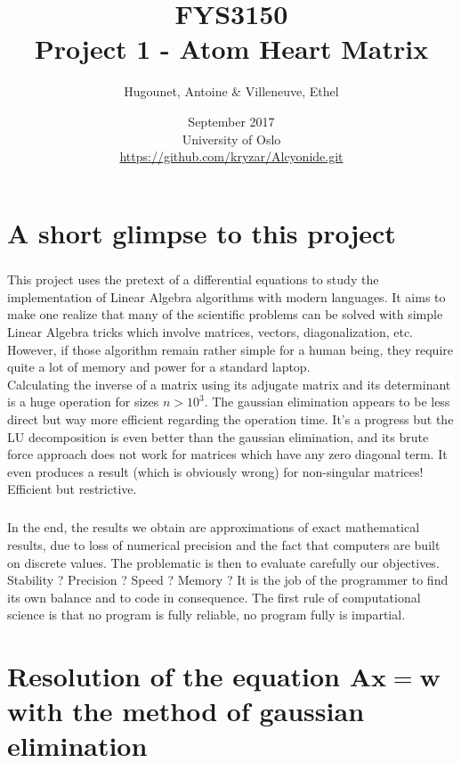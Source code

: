 \documentclass[a4paper, twoside, 11pt]{report}
\title{FYS3150\\Project 1 - Atom Heart Matrix}
\author{Hugounet, Antoine \& Villeneuve, Ethel}
\date{September 2017 \\University of Oslo \\ \url{https://github.com/kryzar/Alcyonide.git}}
\theoremstyle{theorem}
\theoremstyle{remark}
\theoremstyle{exemple}
\begin{document}
\maketitle

\renewcommand{\contentsname}{Table of contents}
\tableofcontents
	

\chapter*{A short glimpse to this project}	
	
\paragraph{}This project uses the pretext of a differential equations to study the implementation of Linear Algebra algorithms with modern languages. It aims to make one realize that many of the scientific problems can be solved with simple Linear Algebra tricks which involve matrices, vectors, diagonalization, etc. However, if those algorithm remain rather simple for a human being, they require quite a lot of memory and power for a standard laptop.
	\\Calculating the inverse of a matrix using its adjugate matrix and its determinant is a huge operation for sizes $n>{10}^{3}$. The gaussian elimination appears to be less direct but way more efficient regarding the operation time. It's a progress but the LU decomposition is even better than the gaussian elimination, and its brute force approach does not work for matrices which have any zero diagonal term. It even produces a result (which is obviously wrong) for non-singular matrices! Efficient but restrictive.

\paragraph{}In the end, the results we obtain are approximations of exact mathematical results, due to loss of numerical precision and the fact that computers are built on discrete values. The problematic is then to evaluate carefully our objectives. Stability ? Precision ? Speed ? Memory ? It is the job of the programmer to find its own balance and to code in consequence. The first rule of computational science is that no program is fully reliable, no program fully is impartial.
	
	
	
\chapter{Resolution of the equation $\mathbf{Ax=w}$ with the method of gaussian elimination}
\end{document}
